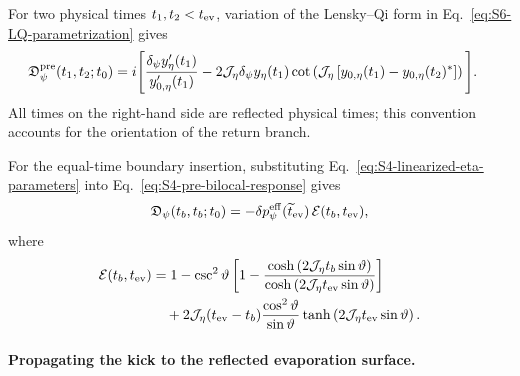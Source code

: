 \documentclass[11pt,a4paper]{article}
\begin{document}
For two physical times \(t_1,t_2<t_{\rm ev}\), variation of the Lensky--Qi
form in Eq.~\eqref{eq:S6-LQ-parametrization} gives
\begin{equation}
\begin{aligned}
  \mathfrak D^{\rm pre}_\psi(t_1,t_2;t_0)
  &=
  i
  \Bigg[
  \frac{
  \delta_\psi y'_\eta(t_1)
  }{
  y'_{0,\eta}(t_1)
  }
  -
  2\mathcal J_\eta
  \delta_\psi y_\eta(t_1)
  \cot\left(
  \mathcal J_\eta
  \left[
  y_{0,\eta}(t_1)
  -
  y_{0,\eta}(t_2)^*
  \right]
  \right)
  \Bigg].
\end{aligned}
\label{eq:S4-pre-bilocal-response}
\end{equation}
All times on the right-hand side are reflected
physical times; this convention accounts for the orientation of the return
branch.

For the equal-time boundary insertion, substituting
Eq.~\eqref{eq:S4-linearized-eta-parameters} into
Eq.~\eqref{eq:S4-pre-bilocal-response} gives
\begin{equation}
  \mathfrak D_\psi(t_b,t_b;t_0)
  =
  -\delta p_\psi^{\rm eff}(\widetilde t_{\rm ev})\,
  \mathcal E(t_b,t_{\rm ev}),
\label{eq:S4-universal-physical-response}
\end{equation}
where
\begin{equation}
\begin{aligned}
  \mathcal E(t_b,t_{\rm ev})
  &=
  1
  -
  \csc^2\vartheta
  \left[
  1-
  \frac{
  \cosh\left(
  2\mathcal J_\eta t_b\sin\vartheta
  \right)
  }{
  \cosh\left(
  2\mathcal J_\eta t_{\rm ev}\sin\vartheta
  \right)
  }
  \right]
  \\
  &\quad
  +
  2\mathcal J_\eta(t_{\rm ev}-t_b)
  \frac{\cos^2\vartheta}{\sin\vartheta}
  \tanh\left(
  2\mathcal J_\eta t_{\rm ev}\sin\vartheta
  \right).
\end{aligned}
\label{eq:S4-enhancement-factor}
\end{equation}

\paragraph*{Propagating the kick to the reflected evaporation surface.}
\end{document}
